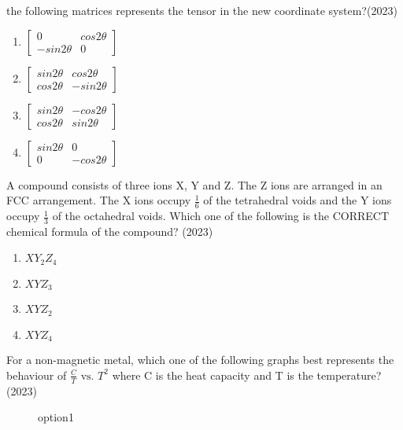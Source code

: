     the following matrices represents the tensor in the new coordinate system?\hfill (2023)
    \begin{enumerate}[label = (\Alph*)]
        \item $\begin{bmatrix}0&cos2\theta\\-sin2\theta&0\end{bmatrix}$
        \item $\begin{bmatrix}sin2\theta&cos2\theta\\cos2\theta&-sin2\theta\end{bmatrix}$
        \item $\begin{bmatrix}sin2\theta&-cos2\theta\\cos2\theta&sin2\theta\end{bmatrix}$
        \item $\begin{bmatrix}sin2\theta&0\\0&-cos2\theta\end{bmatrix}$
    \end{enumerate}
    \item A compound consists of three ions X, Y and Z. The Z ions are arranged in an FCC
    arrangement. The X ions occupy $\frac{1}{6}$ of the tetrahedral voids and the Y ions occupy
    $\frac{1}{3}$ of the octahedral voids. Which one of the following is the CORRECT chemical
    formula of the compound? \hfill (2023)
    \begin{enumerate}[label = (\Alph*)]
        \item $XY_2Z_4$
        \item $XYZ_3$
        \item $XYZ_2$
        \item $XYZ_4$
    \end{enumerate}
    \newpage
    \item For a non-magnetic metal, which one of the following graphs best represents the
    behaviour of $\frac{C}{T} \text{ vs. } T^2$ where C is the heat capacity and T is the temperature? \hfill (2023)
    \begin{figure}[!ht]
        \centering
        \caption{option1}
    \end{figure}
